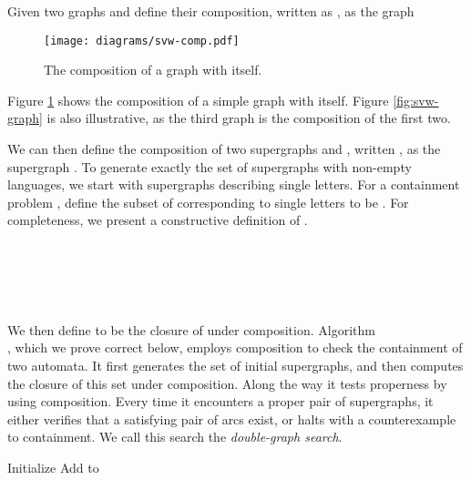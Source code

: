 \documentclass{LMCS}
\newcommand\buchi{B\"uchi }
\begin{document}
\begin{defi}
Given two graphs  and  define their
composition, written as , as the graph  

\end{defi}

\begin{figure}[t]
\begin{center}
{\texttt{[image: diagrams/svw-comp.pdf]}}
\end{center}
\caption{The composition of a graph with itself.}\label{fig:svw-comp}
\end{figure}

\begin{exa}
Figure \ref{fig:svw-comp} shows the composition of a simple graph with itself.
Figure \ref{fig:svw-graph} is also illustrative, as the third graph is
the composition of the first two.
\end{exa}

We can then define the composition of two supergraphs
 and , written
, as the supergraph .  To generate
exactly the set of supergraphs with non-empty languages, we start with supergraphs describing single
letters. For a containment problem , define the subset of 
corresponding to single letters to be .  For completeness, we present a
constructive definition of .

\begin{defi}\label{Def:Buchi_to_Graphs}
\mbox{  }
\begin{tabbing}
\qquad\=\\
\>\=\\
\>\>
\end{tabbing}
\end{defi}

We then define  to be the closure of  under
composition.   Algorithm \\\DGS, which we prove correct below, employs composition to check the
containment of two automata. It first generates the set of initial supergraphs, and then computes
the closure of this set under composition. Along the way it tests properness by using composition.
Every time it encounters a proper pair of supergraphs, it either verifies that a satisfying pair
of arcs exist, or halts with a counterexample to containment. We call this search the
\emph{double-graph search}. 

\begin{algorithm}[htbp]
\caption{}
\label{Alg:DoubleGraphSearch}
\DontPrintSemicolon
\KwData{Two \buchi automata,  and .}
  Initialize \;
  {
  {
      Add  to \;
      {
          {
          }
      }
  }
  }
\end{algorithm}
\end{document}
